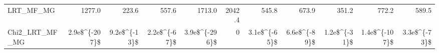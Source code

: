 \begin{tabular}{lrrrrrrrrrr}
LRT\_MF\_MG         &        1277.0 &        223.6 &        557.6 &                 1713.0 &                 2042.4 &            545.8 &         673.9 &        351.2 &         772.2 &        589.5 \\
Chi2\_LRT\_MF\_MG    & 2.9e\$\textasciicircum \{-207\}\$ & 9.2e\$\textasciicircum \{-13\}\$ & 2.2e\$\textasciicircum \{-67\}\$ &          3.9e\$\textasciicircum \{-296\}\$ &                      0 &     3.1e\$\textasciicircum \{-65\}\$ &  6.6e\$\textasciicircum \{-89\}\$ & 1.2e\$\textasciicircum \{-31\}\$ & 1.4e\$\textasciicircum \{-107\}\$ & 3.3e\$\textasciicircum \{-73\}\$ \\
\bottomrule
\end{tabular}
